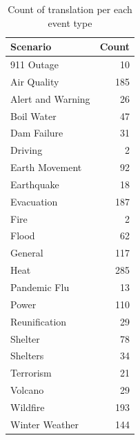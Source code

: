 \begin{table}
\centering
\begin{tabular}{lr}
\toprule
\textbf{Scenario} & \textbf{Count} \\
\midrule
911 Outage & 10 \\
Air Quality & 185 \\
Alert and Warning & 26 \\
Boil Water & 47 \\
Dam Failure & 31 \\
Driving & 2 \\
Earth Movement & 92 \\
Earthquake & 18 \\
Evacuation & 187 \\
Fire & 2 \\
Flood & 62 \\
General & 117 \\
Heat & 285 \\
Pandemic Flu & 13 \\
Power & 110 \\
Reunification & 29 \\
Shelter & 78 \\
Shelters & 34 \\
Terrorism & 21 \\
Volcano & 29 \\
Wildfire & 193 \\
Winter Weather & 144 \\
\bottomrule
\end{tabular}
\caption{Count of translation per each event type}
\label{tab:domain_counts_combined}

\end{table}